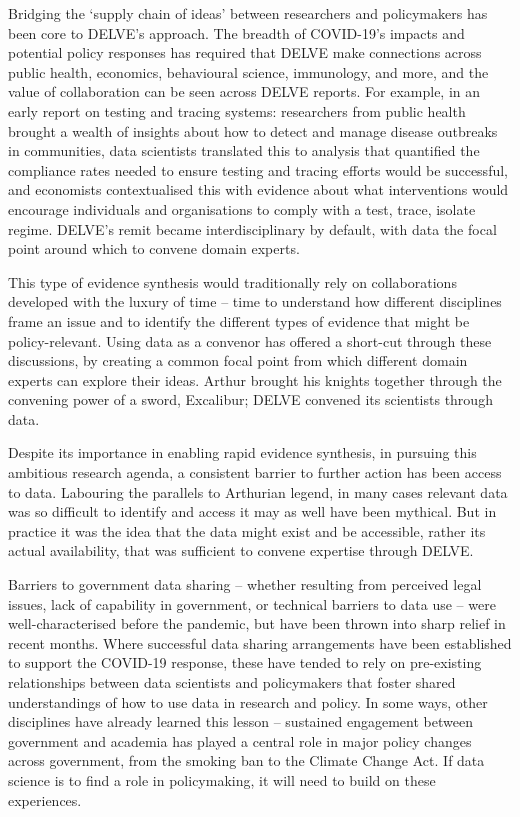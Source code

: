 \documentclass[a4paper]{caesar_book}
\begin{document}
Bridging the ‘supply chain of ideas’ between researchers and policymakers has been core to DELVE’s approach. The breadth of COVID-19’s impacts and potential policy responses has required that DELVE make connections across public health, economics, behavioural science, immunology, and more, and the value of collaboration can be seen across DELVE reports. For example, in an early report on testing and tracing systems: researchers from public health brought a wealth of insights about how to detect and manage disease outbreaks in communities, data scientists translated this to analysis that quantified the compliance rates needed to ensure testing and tracing efforts would be successful, and economists contextualised this with evidence about what interventions would encourage individuals and organisations to comply with a test, trace, isolate regime. DELVE’s remit became interdisciplinary by default, with data the focal point around which to convene domain experts.

This type of evidence synthesis would traditionally rely on collaborations developed with the luxury of time – time to understand how different disciplines frame an issue and to identify the different types of evidence that might be policy-relevant. Using data as a convenor has offered a short-cut through these discussions, by creating a common focal point from which different domain experts can explore their ideas. Arthur brought his knights together through the convening power of a sword, Excalibur; DELVE convened its scientists through data.

Despite its importance in enabling rapid evidence synthesis, in pursuing this ambitious research agenda, a consistent barrier to further action has been access to data. Labouring the parallels to Arthurian legend, in many cases relevant data was so difficult to identify and access it may as well have been mythical. But in practice it was the idea that the data might exist and be accessible, rather its actual availability, that was sufficient to convene expertise through DELVE.

Barriers to government data sharing – whether resulting from perceived legal issues, lack of capability in government, or technical barriers to data use – were well-characterised before the pandemic, but have been thrown into sharp relief in recent months. Where successful data sharing arrangements have been established to support the COVID-19 response, these have tended to rely on pre-existing relationships between data scientists and policymakers that foster shared understandings of how to use data in research and policy. In some ways, other disciplines have already learned this lesson – sustained engagement between government and academia has played a central role in major policy changes across government, from the smoking ban to the Climate Change Act. If data science is to find a role in policymaking, it will need to build on these experiences.
\end{document}

